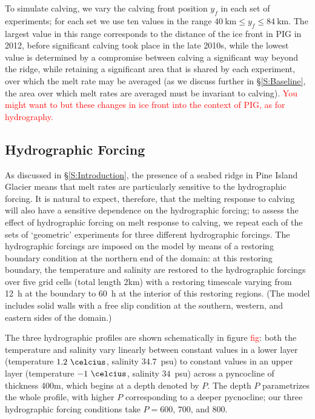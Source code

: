 \documentclass[draft]{agujournal2019}
\newcommand{\red}[1]{\textcolor{red}{#1}}
\begin{document}
To simulate calving, we vary the calving front position $y_f$ in each set of experiments; for each set we use ten values in the range $40~\text{km} \leq y_f \leq 84~\text{km}$. The largest value in this range corresponds to the distance of the ice front in PIG in 2012, before significant calving took place in the late 2010s, while the lowest value is determined by a compromise between calving a significant way beyond the ridge, while retaining a significant area that is shared by each experiment, over which the melt rate may be averaged (as we discuss further in \S\ref{S:Baseline}, the area over which melt rates are averaged must be invariant to calving). \red{You might want to but these changes in ice front into the context of PIG, as for hydrography.}


\subsection{Hydrographic Forcing}\label{S:Experiment:Hydrography}

As discussed in \S\ref{S:Introduction}, the presence of a seabed ridge in Pine Island Glacier means that melt rates are particularly sensitive to the hydrographic forcing. It is natural to expect, therefore, that the melting response to calving will also have a sensitive dependence on the hydrographic forcing; to assess the effect of hydrographic forcing on melt response to calving, we repeat each of the sets of `geometric' experiments for three different hydrographic forcings. The hydrographic forcings are imposed on the model by means of a restoring boundary condition at the northern end of the domain: at this restoring boundary, the temperature and salinity are restored to the hydrographic forcings over five grid cells (total length 2km) with a restoring timescale varying from 12~h at the boundary to 60~h at the interior of this restoring regions. (The model includes solid walls with a free slip condition at the southern, western, and eastern sides of the domain.)

The three hydrographic profiles are shown schematically in figure \red{fig}: both the temperature and salinity vary linearly between constant values in a lower layer (temperature $1.2~\si{\celcius}$, salinity $34.7$~psu) to constant values in an upper layer (temperature $-1~\si{\celcius}$, salinity $34$~psu) across a pyncocline of thickness 400m, which begins at a depth denoted by $P$. The depth $P$ parametrizes the whole profile, with higher $P$ corresponding to a deeper pycnocline; our three hydrographic forcing conditions take $P = 600$, $700$, and $800$. 
\end{document}
